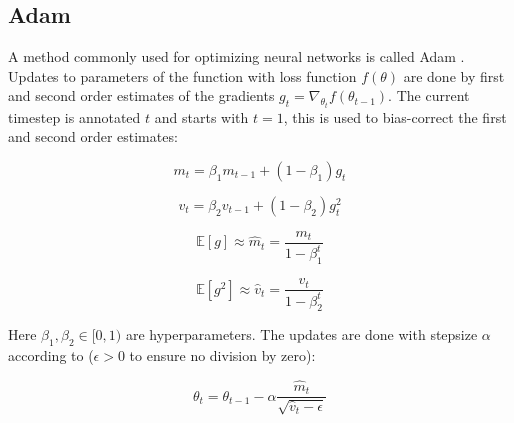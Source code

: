 \subsection{Adam}

A method commonly used for optimizing neural networks is called Adam
\cite{kingma2014adam}.  Updates to parameters of the function with loss
function $f(\theta)$ are done by first and second order estimates of the
gradients $g_t = \nabla_{\theta_t} f(\theta_{t-1})$. The current timestep is
annotated $t$ and starts with $t = 1$, this is used to bias-correct
the first and second order estimates:

\begin{equation}
    m_t = \beta_1 m_{t-1} + (1 - \beta_1) g_t
\end{equation}

\begin{equation}
    v_t = \beta_2 v_{t-1} + (1 - \beta_2) g_t^2
\end{equation}

\begin{equation}
    \mathbb{E}\left[g \right] \approx \hat{m}_t = \frac{m_t}{1- \beta_1^t}
\end{equation}

\begin{equation}
    \mathbb{E}\left[g^2 \right] \approx \hat{v}_t = \frac{v_t}{1- \beta_2^t}
\end{equation}

Here $\beta_1, \beta_2 \in [0, 1)$ are hyperparameters. The updates are done
with stepsize $\alpha$ according to ($\epsilon >0$ to ensure no division by zero):

\begin{equation}
    \theta_t = \theta_{t-1} - \alpha \frac{\hat{m}_t}{\sqrt{\hat{v}_t - \epsilon}}
\end{equation}


